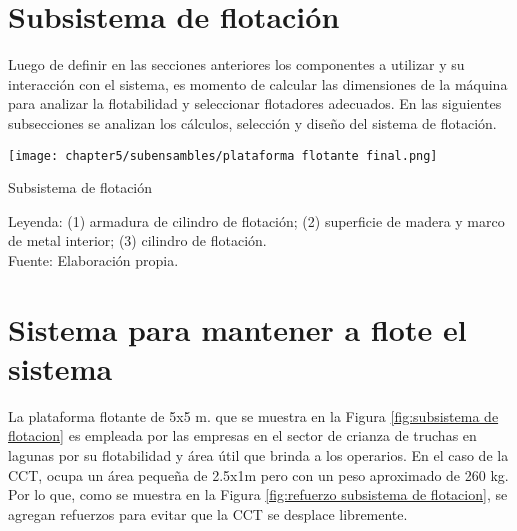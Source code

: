 \vspace{-2.0 em}


\section{Subsistema de flotación}

Luego de definir en las secciones anteriores los componentes a utilizar y su interacción con el sistema, es momento de calcular las dimensiones de la máquina para analizar la flotabilidad y seleccionar flotadores adecuados. En las siguientes subsecciones se analizan los cálculos, selección y diseño del sistema de flotación.%

\begin{myfigure}[H]
	\footnotesize\centering
	\texttt{[image: chapter5/subensambles/plataforma flotante final.png]}
	\caption{Subsistema de flotación}
	\begin{myflushcenter}
		Leyenda: (1) armadura de cilindro de flotación; (2) superficie de madera y marco de metal interior; (3) cilindro de flotación.\\
		Fuente: Elaboración propia.
	\end{myflushcenter}
	\label{fig:subsistema de flotacion}
\end{myfigure}

\vspace{-2.0em}

\section{Sistema para mantener a flote el sistema}

La plataforma flotante de 5x5 m. que se muestra en la Figura \ref{fig:subsistema de flotacion} es empleada por las empresas en el sector de crianza de truchas en lagunas por su flotabilidad y área útil que brinda a los operarios. En el caso de la CCT, ocupa un área pequeña de 2.5x1m pero con un peso aproximado de 260 kg. Por lo que, como se muestra en la Figura \ref{fig:refuerzo subsistema de flotacion}, se agregan refuerzos para evitar que la CCT se desplace libremente.

